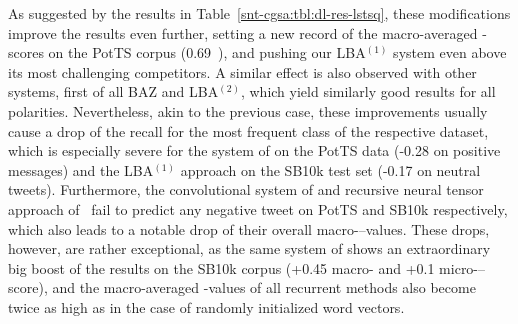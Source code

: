 As suggested by the results in Table~\ref{snt-cgsa:tbl:dl-res-lstsq},
these modifications improve the results even further, setting a new
record of the macro-averaged \F-scores on the PotTS corpus (0.69~\F),
and pushing our LBA$^{(1)}$ system even above its most challenging
competitors.  A similar effect is also observed with other systems,
first of all BAZ and LBA$^{(2)}$, which yield similarly good results
for all polarities.  Nevertheless, akin to the previous case, these
improvements usually cause a drop of the recall for the most frequent
class of the respective dataset, which is especially severe for the
system of \citeauthor{Baziotis:17} on the PotTS data (-0.28 on
positive messages) and the LBA$^{(1)}$ approach on the SB10k test set
(-0.17 on neutral tweets).  Furthermore, the convolutional system of
\citeauthor{Severyn:15} and recursive neural tensor approach
of~\citet{Socher:13} fail to predict any negative tweet on PotTS and
SB10k respectively, which also leads to a notable drop of their
overall macro-\F--values.  These drops, however, are rather
exceptional, as the same system of \citeauthor{Severyn:15} shows an
extraordinary big boost of the results on the SB10k corpus (+0.45
macro-\F{} and +0.1 micro-\F--score), and the macro-averaged \F-values
of all recurrent methods also become twice as high as in the case of
randomly initialized word vectors.

